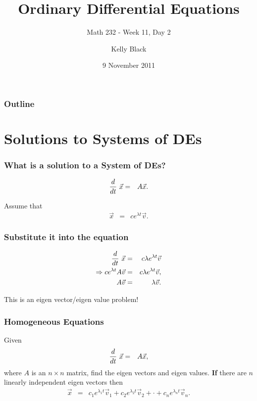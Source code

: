 
\title{Ordinary Differential Equations}
\subtitle{Math 232 - Week 11, Day 2}

\author{Kelly Black}
\date{9 November 2011}

\begin{frame}
  \titlepage
\end{frame}

\begin{frame}
  \frametitle{Outline}
\end{frame}


\section{Solutions to Systems of DEs}


\begin{frame}
  \frametitle{What is a solution to a System of DEs?}

  \begin{eqnarray*}
    \deriv{~}{t} \vec{x} & = & A \vec{x}.
  \end{eqnarray*}

  {
    Assume that 
    \begin{eqnarray*}
      \vec{x} & = & c e^{\lambda t} \vec{v}.
    \end{eqnarray*}
  }


\end{frame}


\begin{frame}
  \frametitle{Substitute it into the equation}

  \begin{eqnarray*}
    \deriv{~}{t} \vec{x} & = & c \lambda e^{\lambda t} \vec{v} \\
    \Rightarrow c  e^{\lambda t} A \vec{v} & = & c \lambda e^{\lambda t} \vec{v}, \\
    A \vec{v} & = & \lambda \vec{v}.
  \end{eqnarray*}

  This is an eigen vector/eigen value problem!

\end{frame}


\begin{frame}
  \frametitle{Homogeneous Equations}

  Given
  \begin{eqnarray*}
    \deriv{~}{t} \vec{x} & = & A \vec{x},
  \end{eqnarray*}
  where $A$ is an $n\times n$ matrix, find the eigen vectors and eigen
  values. \textbf{If} there are $n$ linearly independent eigen vectors
  then 
  \begin{eqnarray*}
    \vec{x} & = & c_1 e^{\lambda_1 t} \vec{v}_1 + c_2 e^{\lambda_2 t} \vec{v}_2 +
    \cdot + c_n e^{\lambda_n t} \vec{v}_n.
  \end{eqnarray*}

\end{frame}

